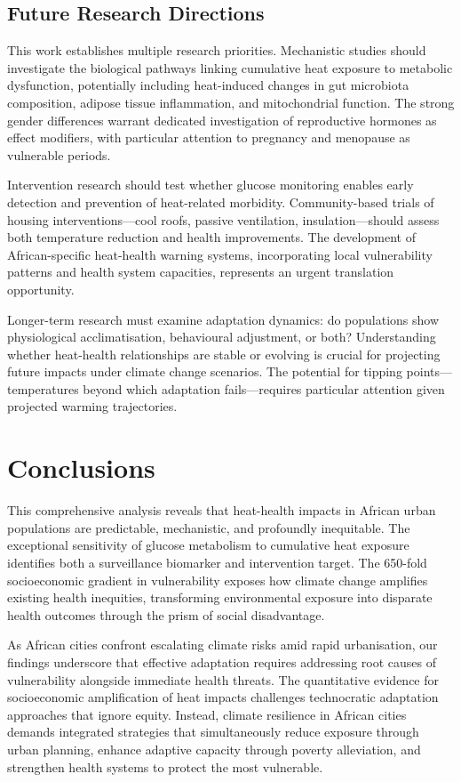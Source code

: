 \documentclass[11pt,a4paper]{article}
\begin{document}
\subsection{Future Research Directions}

This work establishes multiple research priorities. Mechanistic studies should investigate the biological pathways linking cumulative heat exposure to metabolic dysfunction, potentially including heat-induced changes in gut microbiota composition, adipose tissue inflammation, and mitochondrial function. The strong gender differences warrant dedicated investigation of reproductive hormones as effect modifiers, with particular attention to pregnancy and menopause as vulnerable periods.

Intervention research should test whether glucose monitoring enables early detection and prevention of heat-related morbidity. Community-based trials of housing interventions—cool roofs, passive ventilation, insulation—should assess both temperature reduction and health improvements. The development of African-specific heat-health warning systems, incorporating local vulnerability patterns and health system capacities, represents an urgent translation opportunity.

Longer-term research must examine adaptation dynamics: do populations show physiological acclimatisation, behavioural adjustment, or both? Understanding whether heat-health relationships are stable or evolving is crucial for projecting future impacts under climate change scenarios. The potential for tipping points—temperatures beyond which adaptation fails—requires particular attention given projected warming trajectories.

\section{Conclusions}

This comprehensive analysis reveals that heat-health impacts in African urban populations are predictable, mechanistic, and profoundly inequitable. The exceptional sensitivity of glucose metabolism to cumulative heat exposure identifies both a surveillance biomarker and intervention target. The 650-fold socioeconomic gradient in vulnerability exposes how climate change amplifies existing health inequities, transforming environmental exposure into disparate health outcomes through the prism of social disadvantage.

As African cities confront escalating climate risks amid rapid urbanisation, our findings underscore that effective adaptation requires addressing root causes of vulnerability alongside immediate health threats. The quantitative evidence for socioeconomic amplification of heat impacts challenges technocratic adaptation approaches that ignore equity. Instead, climate resilience in African cities demands integrated strategies that simultaneously reduce exposure through urban planning, enhance adaptive capacity through poverty alleviation, and strengthen health systems to protect the most vulnerable.
\end{document}
